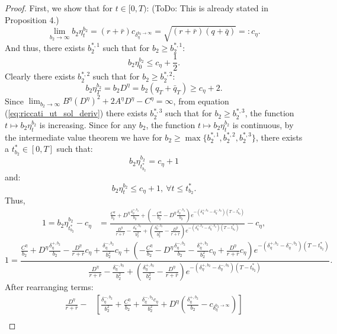\documentclass[11pt]{article}
\begin{document}
\begin{proof}
	First, we show that for $t\in[0,T)$: (ToDo: This is already stated in Proposition 4.)
	$$\lim_{b_2 \to \infty}b_2\eta^{b_2}_t=(r + \bar{r}) c_{\delta_{\eta}^{b_2 \to \infty}}=\sqrt{(r+\bar{r})(q+\bar{q})} =: c_\eta.$$
	And thus, there exists $b_2^{*,1}$ such that for $b_2 \geq b_2^{*,1}$:
	$$b_2\eta^{b_2}_0 \leq c_\eta+\frac{1}{2}.$$
	Clearly there exists $b_2^{*,2}$ such that for $b_2 \geq b_2^{*,2}$:
	$$b_2\eta^{b_2}_T=b_2D^\eta=b_2(q_T+\bar{q}_T)\geq c_\eta+2.$$
	Since $\lim_{b_2 \to \infty} B^\eta (D^\eta)^2+2A^\eta D^\eta-C^\eta=\infty$, from equation (\ref{eq:riccati_ut_sol_deriv}) there exists $b_2^{*,3}$ such that for $b_2 \geq b_2^{*,3}$, the function $t \mapsto b_2 \eta^{b_2}_t$ is increasing. Since for any $b_2$, the function $t \mapsto b_2 \eta^{b_2}_t$ is continuous, by the intermediate value theorem we have for $b_2 \geq \max \{b_2^{*,1},b_2^{*,2},b_2^{*,3} \}$, there exists a $t^*_{b_2}\in[0,T]$ such that:
	$$b_2 \eta^{b_2}_{t^*_{b_2}} =c_\eta+1$$
	and:
	$$b_2 \eta^{b_2}_t \leq c_\eta+1,\ \forall t\leq t^*_{b_2}.$$
	Thus,
	\begin{equation*}
	\begin{split}
	1=b_2\eta^{b_2}_{t^*_{b_2}}-c_\eta&=\frac{ \frac{C^\eta}{b_2}+D^\eta\frac{\delta^{+,b_2}_\eta}{b_2}+\left(-\frac{C^\eta}{b_2}-D^\eta\frac{\delta^{-,b_2}_\eta}{b_2} \right)e^{-(\delta^{+,b_2}_\eta-\delta^{-,b_2}_\eta)(T-t^*_{b_2})} }{ \frac{D^\eta}{r+\bar{r}} -\frac{\delta^{-,b_2}_\eta}{b_2^2} +\left(\frac{\delta^{+,b_2}_\eta}{b_2^2} -\frac{D^\eta}{r+\bar{r}}\right) e^{-(\delta^{+,b_2}_\eta-\delta^{-,b_2}_\eta)(T-t^*_{b_2})}}-c_\eta,
	\end{split}
	\end{equation*}
	$$
	1=\frac{ \frac{C^\eta}{b_2}+D^\eta\frac{\delta^{+,b_2}_\eta}{b_2}-\frac{D^\eta}{r+\bar{r}}c_\eta +\frac{\delta^{-,b_2}_\eta}{b_2^2}c_\eta+\left(-\frac{C^\eta}{b_2}-D^\eta\frac{\delta^{-,b_2}_\eta}{b_2} -\frac{\delta^{+,b_2}_\eta}{b_2^2}c_\eta +\frac{D^\eta}{r+\bar{r}}c_\eta\right)e^{-(\delta^{+,b_2}_\eta-\delta^{-,b_2}_\eta)(T-t^*_{b_2})} }{ \frac{D^\eta}{r+\bar{r}} -\frac{\delta^{-,b_2}_\eta}{b_2^2} +\left(\frac{\delta^{+,b_2}_\eta}{b_2^2} -\frac{D^\eta}{r+\bar{r}}\right) e^{-(\delta^{+,b_2}_\eta-\delta^{-,b_2}_\eta)(T-t^*_{b_2})}}.
	$$
	After rearranging terms:
	\begin{equation}
	\begin{split}
	\frac{D^\eta}{r+\bar{r}}-&\left[\frac{\delta^{-,b_2}_\eta}{b_2^2}+\frac{C^\eta}{b_2}+\frac{\delta^{-,b_2}_\eta c_\eta}{b_2^2}+D^\eta \left(\frac{\delta^{+,b_2}_\eta}{b_2}-c_{\delta^{b_2 \to \infty}_\eta} \right)\right] \\

\end{split}
\end{equation}
\end{proof}
\end{document}
